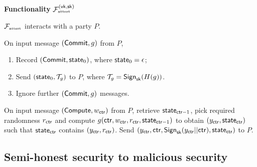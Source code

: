 

\begin{tffbox}
\begin{mdframed}
\begin{center}
{\bf Functionality} $\fattest^{(\vk,\sksign)}$
\end{center}
{\small

$\mathcal{F}_{\textrm{\tiny{attest}}}$ interacts with a party $P$.

\begin{tiret}
       \item On input message $(\mathsf{Commit},g)$ from $P$,
       \begin{enumerate}
       \item Record $(\mathsf{Commit},\mathsf{state}_0)$, where $\mathsf{state}_0 = \epsilon$;
       \item Send $( \mathsf{state}_0, \mathcal{T}_g)$ to $P$, where $\mathcal{T}_g = \mathsf{Sign}_{\mathsf{sk}}(H(g))$.
       \item Ignore further $(\mathsf{Commit},g)$ messages.
       \end{enumerate}
	\item  On input message $(\mathsf{Compute},w_{\mathsf{ctr}})$ from $P$, retrieve $\mathsf{state}_{\mathsf{ctr}-1}$, pick required randomness $r_{\mathsf{ctr}}$ and compute $g(\mathsf{ctr},w_{\mathsf{ctr}},r_{\mathsf{ctr}},\mathsf{state}_{\mathsf{ctr}-1})$ to obtain $(y_{\mathsf{ctr}},\mathsf{state}_{\mathsf{ctr}})$ such that $\mathsf{state}_{\mathsf{ctr}}$ contains $(y_{\mathsf{ctr}}, r_{\mathsf{ctr}})$. Send $(y_{\mathsf{ctr}},\mathsf{ctr}, \mathsf{Sign}_{\mathsf{sk}}(y_{\mathsf{ctr}} || \mathsf{ctr}),\mathsf{state}_{\mathsf{ctr}})$ to $P$.
	       			
\end{tiret}
} %
\end{mdframed}
\caption{\sl The Authentication functionality $\fattest^{(\vk,\sksign)}$.}
\label{fig:attestideal}
\end{tffbox}


\subsection{Semi-honest security to malicious security}
\label{subsec:nextmessagefunction}

